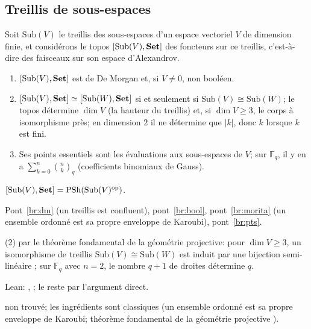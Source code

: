 \subsection{Treillis de sous-espaces}

Soit $\mathrm{Sub}(V)$ le treillis des sous-espaces d'un espace vectoriel $V$ de dimension finie, et considérons le topos $[\mathrm{Sub}(V),\mathbf{Set}]$ des foncteurs sur ce treillis, c'est-à-dire des faisceaux sur son espace d'Alexandrov.

\begin{theorem}\label{th:subspaces}
\begin{enumerate}
\item $[\mathrm{Sub}(V),\mathbf{Set}]$ est de De Morgan et, si $V\neq 0$, non booléen.
\item $[\mathrm{Sub}(V),\mathbf{Set}]\simeq[\mathrm{Sub}(W),\mathbf{Set}]$ si et seulement si $\mathrm{Sub}(V)\cong\mathrm{Sub}(W)$; le topos détermine $\dim V$ (la hauteur du treillis) et, si $\dim V\ge 3$, le corps à isomorphisme près; en dimension $2$ il ne détermine que $|k|$, donc $k$ lorsque $k$ est fini.
\item Ses points essentiels sont les évaluations aux sous-espaces de $V$; sur $\mathbb F_q$, il y en a $\sum_{k=0}^{n}\binom nk_q$ (coefficients binomiaux de Gauss).
\end{enumerate}
\end{theorem}

\begin{trace}
\item[tablier] $[\mathrm{Sub}(V),\mathbf{Set}] = \mathrm{PSh}(\mathrm{Sub}(V)^{\mathrm{op}})$.
\item[arche] Pont~\ref{br:dm} (un treillis est confluent), pont~\ref{br:bool}, pont~\ref{br:morita} (un ensemble ordonné est sa propre enveloppe de Karoubi), pont~\ref{br:pts}.
\item[réécrire] (2) par le théorème fondamental de la géométrie projective: pour $\dim V\ge 3$, un isomorphisme de treillis $\mathrm{Sub}(V)\cong\mathrm{Sub}(W)$ est induit par une bijection semi-linéaire \cite{artin-geometric}; sur $\mathbb F_q$ avec $n = 2$, le nombre $q+1$ de droites détermine $q$.
\item[vérifier] Lean: , ; le reste par l'argument direct.
\item[nouveauté] non trouvé; les ingrédients sont classiques (un ensemble ordonné est sa propre enveloppe de Karoubi; théorème fondamental de la géométrie projective \cite{artin-geometric}).
\end{trace}

